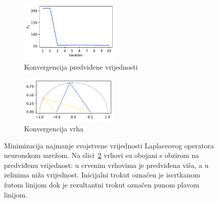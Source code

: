 \begin{figure}[htb!]
    \centering
    \begin{subfigure}{53mm}
        \centering
        \includegraphics[width = 48mm]{figures/neural_network_minimisation_values.pdf}
        \caption{Konvergencija predviđene vrijednosti}
        \label{fig:neural_network_minimisation_values}
    \end{subfigure}
    \begin{subfigure}{52mm}
        \centering
        \includegraphics[width = 47mm]{figures/neural_network_minimisation_vertices.pdf}
        \caption{Konvergencija vrha}
        \label{fig:neural_network_minimisation_vertices}
    \end{subfigure}
    \caption[Minimizacija najmanje svojstvene vrijednosti Laplaceovog operatora neuronskom mrežom]{Minimizacija najmanje svojstvene vrijednosti Laplaceovog operatora neuronskom mrežom. Na slici~\ref{fig:neural_network_minimisation_vertices} vrhovi su obojani s obzirom na predviđenu vrijednost: u crvenim vrhovima je predviđena viša, a u zelinima niža vrijednost. Inicijalni trokut označen je iscrtkanom žutom linijom dok je rezultantni trokut označen punom plavom linijom.}
    \label{fig:neural_network_minimisation}
\end{figure}

\par

